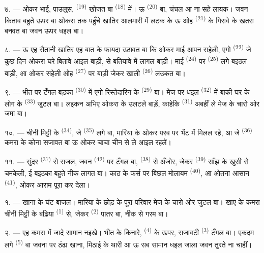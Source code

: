 \VUsaut{5.0mm}
\VUsaut{3.0mm}

७. --- ओकर भाई, पाउलुस,  \textsuperscript{(19)} खोजत बा
 \textsuperscript{(18)} में। ऊ 
\textsuperscript{(20)} बा, चंचल आ ना सहे लायक। जवन किताब बहुते ऊपर बा
ओकरा तक पहुँचे खातिर आलमारी में लटक के ऊ ओह 
\textsuperscript{(21)} के गिरावे के खतरा बनवत बा जवन ऊपर धइल बा।

८. --- ऊ एह सैतानी खातिर एह बात के फायदा उठावत बा कि ओकर माई आपन
सहेली, एगो  \textsuperscript{(22)} जे कुछ दिन ओकरा घरे
बितावे आइल बाड़ी, से बतियावे में लागल बाड़ी। माई 
\textsuperscript{(24)} पर  \textsuperscript{(25)} लगे
बइठल बाड़ी, आ ओकर सहेली ओह  \textsuperscript{(27)} पर बाड़ी
जेकर खाली  \textsuperscript{(26)} लउकत बा।

९. --- भीत पर टँगल बड़का  \textsuperscript{(30)} में एगो
रिस्तेदारिन के  \textsuperscript{(29)} बा। मेज पर धइल
 \textsuperscript{(32)} में बाकी घर के लोग के 
\textsuperscript{(33)} जुटल बा। लइकन अभिए ओकरा के उलटले बाड़ें, काहेकि
 \textsuperscript{(31)} अबहीं ले मेज के चारो ओर जमा बा।

१०. --- चीनी मिट्टी के  \textsuperscript{(34)}, जे
 \textsuperscript{(35)} लगे बा, मारिया के ओकर परब पर
भेंट में मिलल रहे, आ जे  \textsuperscript{(36)} कमरा के
कोना सजावत बा ऊ ओकर चाचा चीन से ले आइल रहलें।

११. --- सुंदर  \textsuperscript{(37)} से सजल, जवन
 \textsuperscript{(42)} पर टँगल बा,  \textsuperscript{(38)}
से अँजोर, जेकर  \textsuperscript{(39)} साँझ के
खुसी से चमकेली, ई बइठका बहुते नीक लागत बा। काठ के फर्स पर बिछल मोलायम
 \textsuperscript{(40)}, आ ओतना आसान 
\textsuperscript{(41)}, ओकर आराम पूरा कर देला।

\VUsaut{3.6mm}
\VUsaut{3.0mm}

१. --- खाना के घंट बाजल। मारिया के छोड़ के पूरा परिवार मेज के चारो ओर
जुटल बा। खाए के कमरा चीनी मिट्टी के बढ़िया 
\textsuperscript{(1)} से, जेकर  \textsuperscript{(2)} पातर बा,
नीक से गरम बा।

२. --- एह कमरा में जादे सामान नइखे। भीत के किनारे, 
\textsuperscript{(4)} के ऊपर, सजावटी 
\textsuperscript{(3)} टँगल बा। एकदम लगे 
\textsuperscript{(5)} बा जवना पर ठंढा खाना, मिठाई के थारी आ ऊ सब सामान
धइल जाला जवन तुरते ना चाहीं।

